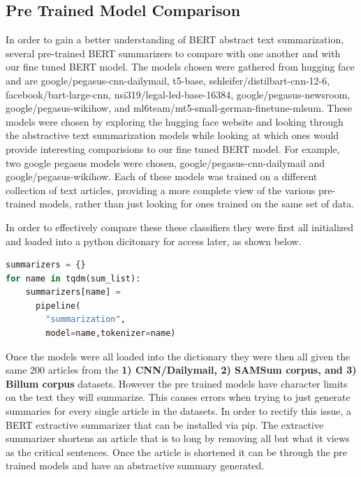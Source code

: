 \documentclass[twoside,twocolumn]{article}
\begin{document}
\subsection{Pre Trained Model Comparison}

In order to gain a better understanding of BERT abstract text summarization, several pre-trained BERT summarizers to compare with one another and with our fine tuned BERT model. The models chosen were gathered from hugging face and are google/pegasus-cnn-dailymail, t5-base, sshleifer/distilbart-cnn-12-6, facebook/bart-large-cnn, nsi319/legal-led-base-16384, google/pegasus-newsroom, google/pegasus-wikihow, and ml6team/mt5-small-german-finetune-mlsum. These models were chosen by exploring the hugging face website and looking through the abstractive text summarization models while looking at which ones would provide interesting comparisions to our fine tuned BERT model. For example, two google pegasus models were chosen, google/pegasus-cnn-dailymail and google/pegasus-wikihow. Each of these models was trained on a different collection of text articles, providing a more complete view of the various pre-trained models, rather than just looking for ones trained on the same set of data.

In order to effectively compare these these classifiers they were first all initialized and loaded into a python dicitonary for access later, as shown below.

\begin{lstlisting}[language=Python]
summarizers = {}
for name in tqdm(sum_list):
    summarizers[name] = 
      pipeline(
        "summarization", 
        model=name,tokenizer=name)
\end{lstlisting}

Once the models were all loaded into the dictionary they were then all given the same 200 articles from the \textbf{1) CNN/Dailymail, 2) SAMSum corpus, and 3) Billum corpus} datasets. However the pre trained models have character limits on the text they will summarize. This causes errors when trying to just generate summaries for every single article in the datasets. In order to rectify this issue, a BERT extractive summarizer that can be installed via pip. The extractive summarizer shortens an article that is to long by removing all but what it views as the critical sentences. Once the article is shortened it can be through the pre trained models and have an abstractive summary generated. 
\end{document}

